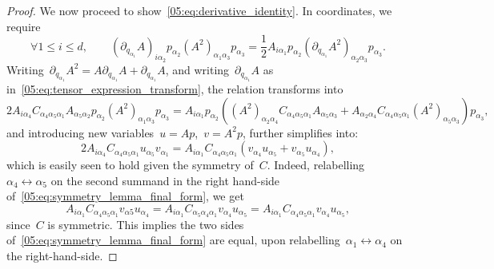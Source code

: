 \begin{proof}
    We now proceed to show~\eqref{05:eq:derivative_identity}. In coordinates, we require
    \begin{equation}
        \forall1\leq i\leq d,\qquad(\partial_{q_{\alpha_1}} A)_{i{\alpha_2}}p_{\alpha_2}\left(A^2\right)_{{\alpha_1}{\alpha_3}}p_{\alpha_3} = \frac12 A_{i{\alpha_1}}p_{\alpha_2}\left(\partial_{q_{\alpha_1}}A^2\right)_{{\alpha_2}{\alpha_3}}p_{\alpha_3}.
    \end{equation}
    Writing~$\partial_{q_{\alpha_1}}A^2 =  A\partial_{q_{\alpha_1}} A + \partial_{q_{\alpha_1}} A$, and writing~$\partial_{q_{\alpha_1}} A$ as in~\eqref{05:eq:tensor_expression_transform}, the relation transforms into
    \begin{equation}
        2A_{i{\alpha_4}}C_{{\alpha_4}{\alpha_5}{\alpha_1}}A_{{\alpha_5}{\alpha_2}}p_{\alpha_2}(A^2)_{{\alpha_1}{\alpha_3}}p_{\alpha_3} =  A_{i{\alpha_1}}p_{\alpha_2}\left((A^2)_{{\alpha_2}{\alpha_4}}C_{{\alpha_4}{\alpha_5}{\alpha_1}}A_{{\alpha_5}{\alpha_3}}+A_{{\alpha_2}{\alpha_4}}C_{{\alpha_4}{\alpha_5}{\alpha_1}}(A^2)_{{\alpha_5}{\alpha_3}}\right)p_{\alpha_3},
    \end{equation}
    and introducing new variables~$u=Ap$,~$v=A^2p$, further simplifies into:
    \begin{equation}
        \label{05:eq:symmetry_lemma_final_form}
        2A_{i{\alpha_4}}C_{{\alpha_4}{\alpha_5}{\alpha_1}}u_{{\alpha_5}}v_{\alpha_1} = A_{i{\alpha_1}}C_{{\alpha_4}{\alpha_5}{\alpha_1}}\left(v_{\alpha_4} u_{{\alpha_5}}  + v_{{\alpha_5}}u_{{\alpha_4}}\right),
    \end{equation}
    which is easily seen to hold given the symmetry of~$C$. Indeed, relabelling~$\alpha_4\leftrightarrow\alpha_5$ on the second summand in the right hand-side of~\eqref{05:eq:symmetry_lemma_final_form}, we get
    \begin{equation}
        A_{i\alpha_1}C_{\alpha_4\alpha_5\alpha_1}v_{\alpha 5}u_{\alpha_4} = A_{i\alpha_1}C_{\alpha_5\alpha_4\alpha_1}v_{\alpha_4}u_{\alpha_5}=A_{i\alpha_1}C_{\alpha_4\alpha_5\alpha_1}v_{\alpha_4}u_{\alpha_5},
    \end{equation}
    since~$C$ is symmetric. This implies the two sides of~\eqref{05:eq:symmetry_lemma_final_form} are equal, upon relabelling~$\alpha_1\leftrightarrow\alpha_4$ on the right-hand-side.
\end{proof}
